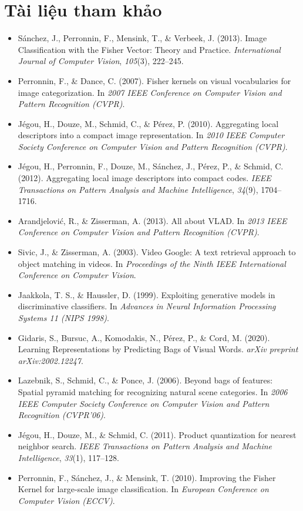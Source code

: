 \section*{Tài liệu tham khảo}
\begin{itemize}
    \item[1] Sánchez, J., Perronnin, F., Mensink, T., \& Verbeek, J. (2013). Image Classification with the Fisher Vector: Theory and Practice. \textit{International Journal of Computer Vision}, \textit{105}(3), 222–245.
    \item[2] Perronnin, F., \& Dance, C. (2007). Fisher kernels on visual vocabularies for image categorization. In \textit{2007 IEEE Conference on Computer Vision and Pattern Recognition (CVPR)}.
    \item[3] Jégou, H., Douze, M., Schmid, C., \& Pérez, P. (2010). Aggregating local descriptors into a compact image representation. In \textit{2010 IEEE Computer Society Conference on Computer Vision and Pattern Recognition (CVPR)}.
    \item[4] Jégou, H., Perronnin, F., Douze, M., Sánchez, J., Pérez, P., \& Schmid, C. (2012). Aggregating local image descriptors into compact codes. \textit{IEEE Transactions on Pattern Analysis and Machine Intelligence}, \textit{34}(9), 1704–1716.
    \item[5] Arandjelović, R., \& Zisserman, A. (2013). All about VLAD. In \textit{2013 IEEE Conference on Computer Vision and Pattern Recognition (CVPR)}.
    \item[6] Sivic, J., \& Zisserman, A. (2003). Video Google: A text retrieval approach to object matching in videos. In \textit{Proceedings of the Ninth IEEE International Conference on Computer Vision}.
    \item[7] Jaakkola, T. S., \& Haussler, D. (1999). Exploiting generative models in discriminative classifiers. In \textit{Advances in Neural Information Processing Systems 11 (NIPS 1998)}.
    \item[8] Gidaris, S., Bursuc, A., Komodakis, N., Pérez, P., \& Cord, M. (2020). Learning Representations by Predicting Bags of Visual Words. \textit{arXiv preprint arXiv:2002.12247}.
    \item[9] Lazebnik, S., Schmid, C., \& Ponce, J. (2006). Beyond bags of features: Spatial pyramid matching for recognizing natural scene categories. In \textit{2006 IEEE Computer Society Conference on Computer Vision and Pattern Recognition (CVPR'06)}.
    \item[10] Jégou, H., Douze, M., \& Schmid, C. (2011). Product quantization for nearest neighbor search. \textit{IEEE Transactions on Pattern Analysis and Machine Intelligence}, \textit{33}(1), 117–128.
    \item[11] Perronnin, F., Sánchez, J., \& Mensink, T. (2010). Improving the Fisher Kernel for large-scale image classification. In \textit{European Conference on Computer Vision (ECCV)}.
\end{itemize}
